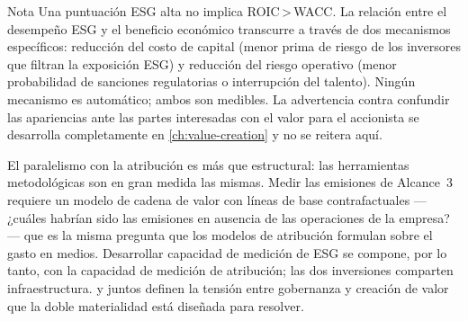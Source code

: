 \begin{admonition}{Nota}
Una puntuación ESG alta no implica ROIC\,>\,WACC. La relación entre el desempeño ESG y el
beneficio económico transcurre a través de dos mecanismos específicos: reducción del costo de
capital (menor prima de riesgo de los inversores que filtran la exposición ESG) y reducción del
riesgo operativo (menor probabilidad de sanciones regulatorias o interrupción del talento). Ningún
mecanismo es automático; ambos son medibles. La advertencia contra confundir las apariencias ante
las partes interesadas con el valor para el accionista se desarrolla completamente en
\cref{ch:value-creation} y no se reitera aquí.
\end{admonition}

El paralelismo con la atribución es más que estructural: las herramientas metodológicas son en gran
medida las mismas. Medir las emisiones de Alcance~3 requiere un modelo de cadena de valor con líneas
de base contrafactuales — ¿cuáles habrían sido las emisiones en ausencia de las operaciones de la
empresa? — que es la misma pregunta que los modelos de atribución formulan sobre el gasto en medios.
Desarrollar capacidad de medición de ESG se compone, por lo tanto, con la capacidad de medición de
atribución; las dos inversiones comparten infraestructura.
\textcite{freeman2010strategic} y \textcite{jensen1976agency} juntos definen la tensión entre
gobernanza y creación de valor que la doble materialidad está diseñada para resolver.
